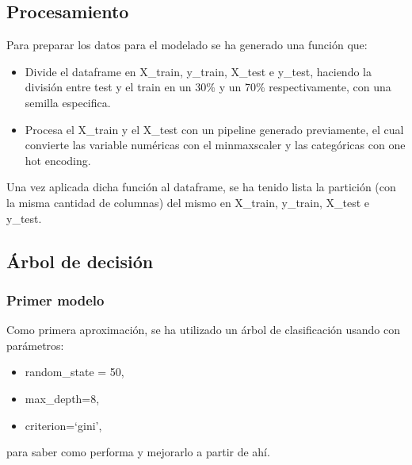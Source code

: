 \documentclass[a4paper]{article}
\begin{document}
    \subsection{Procesamiento}

        Para preparar los datos para el modelado se ha generado una función que:
        \begin{itemize}
            \item  Divide el dataframe en X\_train, y\_train, X\_test e y\_test, haciendo la división entre test y el train en un 30\% y un 70\% respectivamente, con una semilla especifica.
            \item  Procesa el X\_train y el X\_test con un pipeline generado previamente, el cual convierte las variable numéricas con el minmaxscaler y las categóricas con one hot encoding.
        \end{itemize}

        Una vez aplicada dicha función al dataframe, se ha tenido lista la partición (con la misma cantidad de columnas) del mismo en X\_train, y\_train, X\_test e y\_test.

    \subsection{Árbol de decisión}

        \subsubsection{Primer modelo}

            Como primera aproximación, se ha utilizado un árbol de clasificación usando con parámetros:
            \begin{itemize}
                \item random\_state = 50,
                \item max\_depth=8,
                \item criterion=`gini',
            \end{itemize}
            para saber como performa y mejorarlo a partir de ahí.

 \vspace{1cm}
 
\end{document}
